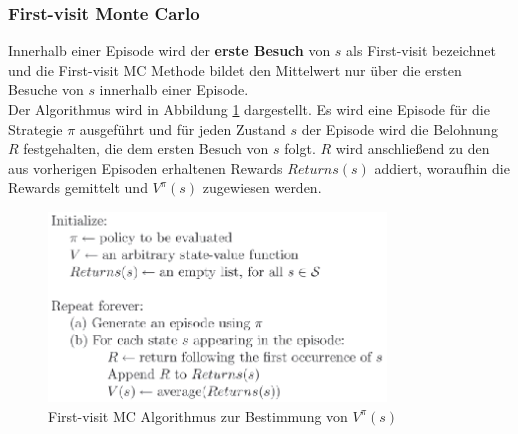 \documentclass[10pt]{scrartcl}
\begin{document}
\subsubsection{First-visit Monte Carlo}
Innerhalb einer Episode wird der \textbf{erste Besuch} von $s$ als First-visit bezeichnet und die First-visit MC Methode bildet den Mittelwert nur über die ersten Besuche von $s$ innerhalb einer Episode.\\
Der Algorithmus wird in Abbildung \ref{fig:FirstVisit} dargestellt. Es wird eine Episode für die Strategie $\pi$ ausgeführt und für jeden Zustand $s$ der Episode wird die Belohnung $R$ festgehalten, die dem ersten Besuch von $s$ folgt. $R$ wird anschließend zu den aus vorherigen Episoden erhaltenen Rewards $Returns(s)$ addiert, woraufhin die Rewards gemittelt und $V^{\pi}(s)$ zugewiesen werden.

\begin{figure}[htbp]
	\centering	\includegraphics[width=0.8\textwidth]{Bilder/First-visit_MC.png}
	\caption{First-visit MC Algorithmus zur Bestimmung von $V^{\pi}(s)$}
	\label{fig:FirstVisit}
\end{figure}
\end{document}
